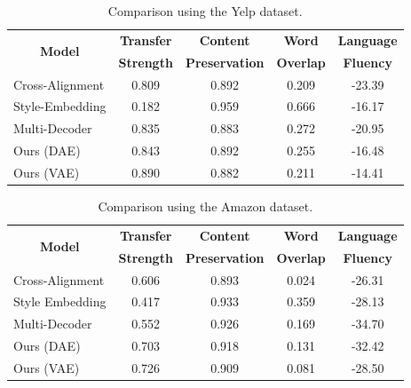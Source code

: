 \documentclass[letterpaper]{article} %
\newcommand{\tabh}[1]{\multicolumn{1}{c|}{\textbf{#1}}}
\newcommand{\tabc}[2]{\multicolumn{1}{|c||}{\multirow{#1}{*}{\textbf{#2}}}}
\begin{document}
\begin{table}[ht]
	\centering
	\begin{tabular}{| l || c | c | c | c |}
		\hline
		\tabc{2}{Model}                            & \tabh{Transfer} & \tabh{Content}      & \tabh{Word}    & \tabh{Language} \\
		                                           & \tabh{Strength} & \tabh{Preservation} & \tabh{Overlap} & \tabh{Fluency}  \\
		\hline
		\hline
		Cross-Alignment \cite{shen2017style}       & 0.809           & 0.892               & 0.209          & -23.39          \\
		\hline
		Style-Embedding \cite{fu2017style}         & 0.182           & 0.959               & 0.666          & -16.17          \\
		\hline
		Multi-Decoder \cite{zhao2018adversarially} & 0.835           & 0.883               & 0.272          & -20.95          \\
		\hline
		Ours (DAE)                                 & 0.843           & 0.892               & 0.255          & -16.48          \\
		\hline
		Ours (VAE)                                 & 0.890           & 0.882               & 0.211          & -14.41          \\
		\hline
	\end{tabular}
	\caption{Comparison using the Yelp dataset.}
	\label{tab:yelp-comparison-previous}
\end{table}

\begin{table}[ht]
	\centering
	\begin{tabular}{| l || c | c | c | c |}
		\hline
		\tabc{2}{Model}                            & \tabh{Transfer} & \tabh{Content}      & \tabh{Word}    & \tabh{Language} \\
		                                           & \tabh{Strength} & \tabh{Preservation} & \tabh{Overlap} & \tabh{Fluency}  \\
		\hline
		\hline
		Cross-Alignment \cite{shen2017style}       & 0.606           & 0.893               & 0.024          & -26.31          \\
		\hline
		Style Embedding \cite{fu2017style}         & 0.417           & 0.933               & 0.359          & -28.13          \\
		\hline
		Multi-Decoder \cite{zhao2018adversarially} & 0.552           & 0.926               & 0.169          & -34.70          \\
		\hline
		Ours (DAE)                                 & 0.703           & 0.918               & 0.131          & -32.42          \\
		\hline
		Ours (VAE)                                 & 0.726           & 0.909               & 0.081          & -28.50          \\
		\hline
	\end{tabular}
	\caption{Comparison using the Amazon dataset.}
	\label{tab:amazon-comparison-previous}
\end{table}
\end{document}
